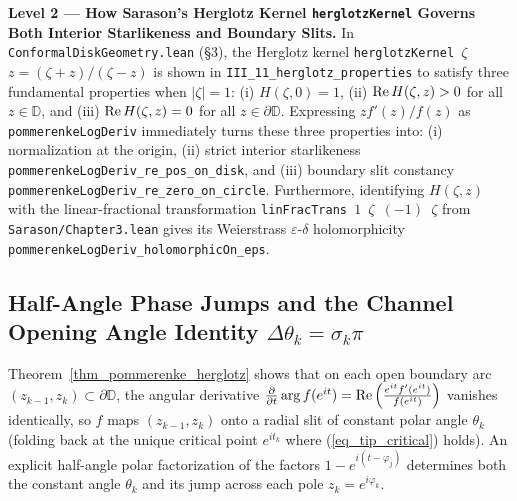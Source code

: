 \documentclass[11pt,reqno]{amsart}
\numberwithin{equation}{section}
\renewcommand{\phi}{\varphi}
\newcommand{\D}{\mathbb{D}}
\newcommand{\eps}{\varepsilon}
\newcommand{\re}{\mbox{\rm Re\,}}
\begin{document}
\begin{leveltwo}
\noindent\textbf{\textcolor{l2border}{Level 2 --- How Sarason's Herglotz Kernel \texttt{herglotzKernel} Governs Both Interior Starlikeness and Boundary Slits.}}
In \texttt{ConformalDiskGeometry.lean} (\S 3), the Herglotz kernel \texttt{herglotzKernel $\zeta$ $z = (\zeta + z)/(\zeta - z)$} is shown in \texttt{III\_11\_herglotz\_properties} to satisfy three fundamental properties when $|\zeta| = 1$: (i) $H(\zeta, 0) = 1$, (ii) $\re H(\zeta, z) > 0$ for all $z \in \D$, and (iii) $\re H(\zeta, z) = 0$ for all $z \in \partial\D$. Expressing $z f'(z)/f(z)$ as \texttt{pommerenkeLogDeriv} immediately turns these three properties into: (i) normalization at the origin, (ii) strict interior starlikeness \texttt{pommerenkeLogDeriv\_re\_pos\_on\_disk}, and (iii) boundary slit constancy \texttt{pommerenkeLogDeriv\_re\_zero\_on\_circle}. Furthermore, identifying $H(\zeta, z)$ with the linear-fractional transformation \texttt{linFracTrans $1$ $\zeta$ $(-1)$ $\zeta$} from \texttt{Sarason/Chapter3.lean} gives its Weierstrass $\eps$-$\delta$ holomorphicity \texttt{pommerenkeLogDeriv\_holomorphicOn\_eps}.
\end{leveltwo}

\subsection{Half-Angle Phase Jumps and the Channel Opening Angle Identity $\Delta\theta_k = \sigma_k\pi$}

Theorem~\ref{thm_pommerenke_herglotz} shows that on each open boundary arc $(z_{k-1}, z_k) \subset \partial\D$, the angular derivative $\frac{\partial}{\partial t}\arg f(e^{it}) = \re\!\left(\frac{e^{it}f'(e^{it})}{f(e^{it})}\right)$ vanishes identically, so $f$ maps $(z_{k-1}, z_k)$ onto a radial slit of constant polar angle $\theta_k$ (folding back at the unique critical point $e^{it_k}$ where (\ref{eq_tip_critical}) holds). An explicit half-angle polar factorization of the factors $1 - e^{i(t - \phi_j)}$ determines both the constant angle $\theta_k$ and its jump across each pole $z_k = e^{i\phi_k}$.
\end{document}
